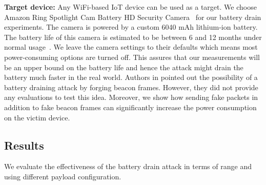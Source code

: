 





\noindent
\textbf{Target device:}
Any WiFi-based IoT device can be used as a target.  We choose Amazon Ring Spotlight Cam Battery HD Security Camera~\cite{ringcamera}
for our battery drain experiments. The camera is powered by a custom 6040 mAh lithium-ion battery. 
The battery life of this camera is estimated to be between 6 and 12 months under normal usage~\cite{xyz, bat2}.
We leave the camera settings to their defaults which means most power-consuming options are turned off. This assures that our measurements will be an upper bound on the battery life and hence the attack might drain the battery much faster in the real world.
Authors in \cite{vanhoef2020protecting} pointed out the possibility of a battery draining attack by forging beacon frames. However, they did not provide any evaluations to test this idea. Moreover, we show how sending fake packets in addition to fake beacon frames can significantly increase the power consumption on the victim device.

\subsection{Results}
We evaluate the effectiveness of the battery drain attack in terms of range and using different payload configuration. 

